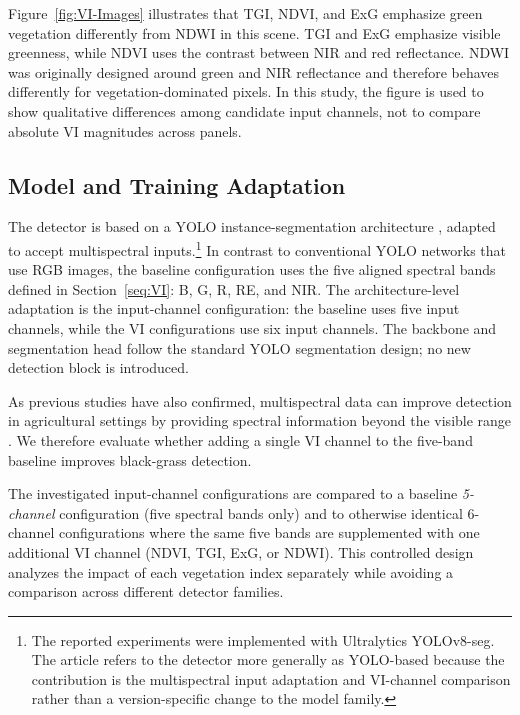 \documentclass{ieeeaccess}
\begin{document}
Figure~\ref{fig:VI-Images} illustrates that TGI, NDVI, and ExG emphasize green vegetation differently from NDWI in this scene. TGI and ExG emphasize visible greenness, while NDVI uses the contrast between NIR and red reflectance. NDWI was originally designed around green and NIR reflectance and therefore behaves differently for vegetation-dominated pixels. In this study, the figure is used to show qualitative differences among candidate input channels, not to compare absolute VI magnitudes across panels.

\subsection{Model and Training Adaptation}

The detector is based on a YOLO instance-segmentation architecture \cite{Jocher_Ultralytics_YOLO_2023}, adapted to accept multispectral inputs.\footnote{The reported experiments were implemented with Ultralytics YOLOv8-seg. The article refers to the detector more generally as YOLO-based because the contribution is the multispectral input adaptation and VI-channel comparison rather than a version-specific change to the model family.} In contrast to conventional YOLO networks that use RGB images, the baseline configuration uses the five aligned spectral bands defined in Section~\ref{seq:VI}: B, G, R, RE, and NIR. The architecture-level adaptation is the input-channel configuration: the baseline uses five input channels, while the VI configurations use six input channels. The backbone and segmentation head follow the standard YOLO segmentation design; no new detection block is introduced.

As previous studies have also confirmed, multispectral data can improve detection in agricultural settings by providing spectral information beyond the visible range \cite{liu_automated_2023, sportelli_evaluation_2023, dutta_multispectral_2021, tang_cgs_yolo_2025}. We therefore evaluate whether adding a single VI channel to the five-band baseline improves black-grass detection.

The investigated input-channel configurations are compared to a baseline \emph{5-channel} configuration (five spectral bands only) and to otherwise identical 6-channel configurations where the same five bands are supplemented with one additional VI channel (NDVI, TGI, ExG, or NDWI). This controlled design analyzes the impact of each vegetation index separately while avoiding a comparison across different detector families.
\end{document}
